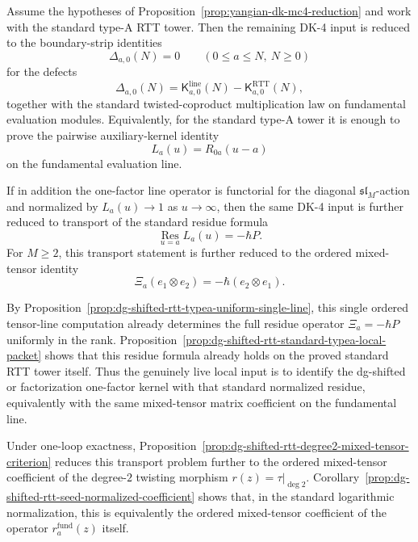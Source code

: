 \begin{proposition}
\label{prop:yangian-dk4-typea-frontier}
Assume the hypotheses of
Proposition~\ref{prop:yangian-dk-mc4-reduction} and work with the
standard type-A RTT tower. Then the remaining DK-4 input is reduced to
the boundary-strip identities
\[
\Delta_{a,0}(N)=0
\qquad (0\le a\le N,\ N\ge 0)
\]
for the defects
\[
\Delta_{a,0}(N)
=\mathsf{K}^{\mathrm{line}}_{a,0}(N)
-\mathsf{K}^{\mathrm{RTT}}_{a,0}(N),
\]
together with the standard twisted-coproduct multiplication law on
fundamental evaluation modules. Equivalently, for the standard type-A
tower it is enough to prove the pairwise auxiliary-kernel identity
\[
L_a(u)=R_{0a}(u-a)
\]
on the fundamental evaluation line.

If in addition the one-factor line operator is functorial for the
diagonal $\mathfrak{sl}_M$-action and normalized by
$L_a(u)\to 1$ as $u\to\infty$, then the same DK-4 input is further
reduced to transport of the standard residue formula
\[
\operatorname*{Res}_{u=a}L_a(u)=-\hbar P.
\]
For $M\ge 2$, this transport statement is further reduced to the
ordered mixed-tensor
identity
\[
\Xi_a(e_1\otimes e_2)=-\hbar(e_2\otimes e_1).
\]

By
Proposition~\ref{prop:dg-shifted-rtt-typea-uniform-single-line},
this single ordered tensor-line computation already determines the full
residue operator $\Xi_a=-\hbar P$ uniformly in the rank.
Proposition~\ref{prop:dg-shifted-rtt-standard-typea-local-packet}
shows that this residue formula already holds on the proved
standard RTT tower itself. Thus the genuinely live local input is to
identify the dg-shifted or factorization one-factor kernel with that
standard normalized residue, equivalently with the same mixed-tensor
matrix coefficient on the fundamental line.

Under one-loop exactness,
Proposition~\ref{prop:dg-shifted-rtt-degree2-mixed-tensor-criterion}
reduces this transport problem further to the ordered mixed-tensor
coefficient of the degree-$2$ twisting morphism $r(z)=\tau|_{\deg 2}$.
Corollary~\ref{prop:dg-shifted-rtt-seed-normalized-coefficient}
shows that, in the standard logarithmic normalization, this is
equivalently the ordered mixed-tensor coefficient of the operator
$r_a^{\mathrm{fund}}(z)$ itself.


\end{proposition}

